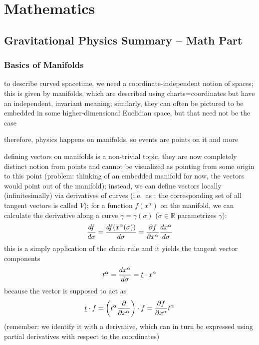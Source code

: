 




\chapter{Mathematics}


	\section{Gravitational Physics Summary -- Math Part}
		\subsection{Basics of Manifolds}
to describe curved spacetime, we need a coordinate-independent notion of spaces; this is given by manifolds, which are described using charts=coordinates but have an independent, invariant meaning; similarly, they can often be pictured to be embedded in some higher-dimensional Euclidian space, but that need not be the case

therefore, physics happens on manifolds, so events are points on it and more


defining vectors on manifolds is a non-trivial topic, they are now completely distinct notion from points and cannot be visualized as pointing from some origin to this point (problem: thinking of an embedded manifold for now, the vectors would point out of the manifold); instead, we can define vectors locally (infinitesimally) via derivatives of curves (i.e.~as ; the corresponding set of all tangent vectors is called  $V$); for a function $f(x^\alpha)$ on the manifold, we can calculate the derivative along a curve $\gamma = \gamma(\sigma)$ ($\sigma \in \mathbb{R}$ parametrizes $\gamma$):
\begin{equation}
\dv{f}{\sigma} = \dv{f(x^\alpha(\sigma))}{\sigma} = \pdv{f}{x^\alpha} \dv{x^\alpha}{\sigma}
\end{equation}
this is a simply application of the chain rule and it yields the tangent vector components
\begin{equation}
t^\alpha = \dv{x^\alpha}{\sigma} = \underline{t} \cdot x^\alpha
\end{equation}
because the vector is supposed to act as
\begin{equation}
\underline{t} \cdot f = \qty(t^\alpha \pdv{x^\alpha}) \cdot f = \pdv{f}{x^\alpha} t^\alpha
\end{equation}
(remember: we identify it with a derivative, which can in turn be expressed using partial derivatives with respect to the coordinates)

